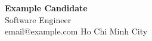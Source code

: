 \documentclass[10pt,a4paper]{article}
\begin{document}
\begin{center}
  {\Huge \textbf{Example Candidate}}\\[3pt]
  \textcolor{darkpink}{Software Engineer}\\[4pt]
  email@example.com \quad \textbar\quad Ho Chi Minh City
\end{center}

\end{document}

